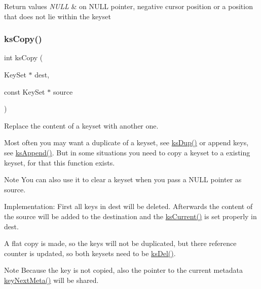 \begin{DoxyRetVals}{Return values}
{\em N\+U\+LL} & on N\+U\+LL pointer, negative cursor position or a position that does not lie within the keyset \\
\hline
\end{DoxyRetVals}
\mbox{\label{group__keyset_gaba1f1dbea191f4d7e7eb3e4296ae7d5e}} 
\subsubsection{\texorpdfstring{ks\+Copy()}{ksCopy()}}
{\footnotesize\ttfamily int ks\+Copy (\begin{DoxyParamCaption}\item[{Key\+Set $\ast$}]{dest,  }\item[{const Key\+Set $\ast$}]{source }\end{DoxyParamCaption})}



Replace the content of a keyset with another one. 

Most often you may want a duplicate of a keyset, see \hyperlink{group__keyset_gac59e4b328245463f1451f68d5106151c}{ks\+Dup()} or append keys, see \hyperlink{group__keyset_ga21eb9c3a14a604ee3a8bdc779232e7b7}{ks\+Append()}. But in some situations you need to copy a keyset to a existing keyset, for that this function exists.

\begin{DoxyNote}{Note}
You can also use it to clear a keyset when you pass a N\+U\+LL pointer as {\ttfamily source}.
\end{DoxyNote}
\begin{DoxyParagraph}{Implementation\+:}
First all keys in {\ttfamily dest} will be deleted. Afterwards the content of the source will be added to the destination and the \hyperlink{group__keyset_ga4287b9416912c5f2ab9c195cb74fb094}{ks\+Current()} is set properly in {\ttfamily dest}.
\end{DoxyParagraph}
A flat copy is made, so the keys will not be duplicated, but there reference counter is updated, so both keysets need to be \hyperlink{group__keyset_ga27e5c16473b02a422238c8d970db7ac8}{ks\+Del()}.

\begin{DoxyNote}{Note}
Because the key is not copied, also the pointer to the current metadata \hyperlink{group__keymeta_ga4c88342f580a4291455a801af71ce048}{key\+Next\+Meta()} will be shared.
\end{DoxyNote}

